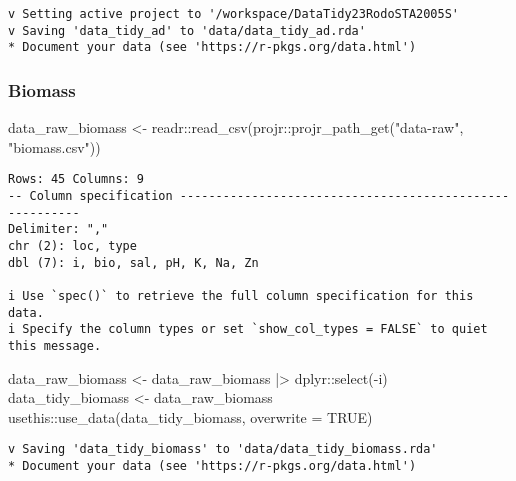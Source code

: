 \documentclass[
  letterpaper,
  DIV=11,
  numbers=noendperiod]{scrartcl}
\newenvironment{Shaded}{\begin{snugshade}}{\end{snugshade}}
\newcommand{\AttributeTok}[1]{\textcolor[rgb]{0.40,0.45,0.13}{#1}}
\newcommand{\ConstantTok}[1]{\textcolor[rgb]{0.56,0.35,0.01}{#1}}
\newcommand{\FunctionTok}[1]{\textcolor[rgb]{0.28,0.35,0.67}{#1}}
\newcommand{\NormalTok}[1]{\textcolor[rgb]{0.00,0.23,0.31}{#1}}
\newcommand{\OtherTok}[1]{\textcolor[rgb]{0.00,0.23,0.31}{#1}}
\newcommand{\SpecialCharTok}[1]{\textcolor[rgb]{0.37,0.37,0.37}{#1}}
\newcommand{\StringTok}[1]{\textcolor[rgb]{0.13,0.47,0.30}{#1}}
\begin{document}
\begin{verbatim}
v Setting active project to '/workspace/DataTidy23RodoSTA2005S'
v Saving 'data_tidy_ad' to 'data/data_tidy_ad.rda'
* Document your data (see 'https://r-pkgs.org/data.html')
\end{verbatim}

\hypertarget{biomass}{%
\subsubsection{Biomass}\label{biomass}}

\begin{Shaded}
\begin{Highlighting}[]
\NormalTok{data\_raw\_biomass }\OtherTok{\textless{}{-}}\NormalTok{ readr}\SpecialCharTok{::}\FunctionTok{read\_csv}\NormalTok{(projr}\SpecialCharTok{::}\FunctionTok{projr\_path\_get}\NormalTok{(}\StringTok{"data{-}raw"}\NormalTok{, }\StringTok{"biomass.csv"}\NormalTok{))}
\end{Highlighting}
\end{Shaded}

\begin{verbatim}
Rows: 45 Columns: 9
-- Column specification --------------------------------------------------------
Delimiter: ","
chr (2): loc, type
dbl (7): i, bio, sal, pH, K, Na, Zn

i Use `spec()` to retrieve the full column specification for this data.
i Specify the column types or set `show_col_types = FALSE` to quiet this message.
\end{verbatim}

\begin{Shaded}
\begin{Highlighting}[]
\NormalTok{data\_raw\_biomass }\OtherTok{\textless{}{-}}\NormalTok{ data\_raw\_biomass }\SpecialCharTok{|\textgreater{}}
\NormalTok{  dplyr}\SpecialCharTok{::}\FunctionTok{select}\NormalTok{(}\SpecialCharTok{{-}}\StringTok{\textasciigrave{}}\AttributeTok{i}\StringTok{\textasciigrave{}}\NormalTok{)}
\NormalTok{data\_tidy\_biomass }\OtherTok{\textless{}{-}}\NormalTok{ data\_raw\_biomass}
\NormalTok{usethis}\SpecialCharTok{::}\FunctionTok{use\_data}\NormalTok{(data\_tidy\_biomass, }\AttributeTok{overwrite =} \ConstantTok{TRUE}\NormalTok{)}
\end{Highlighting}
\end{Shaded}

\begin{verbatim}
v Saving 'data_tidy_biomass' to 'data/data_tidy_biomass.rda'
* Document your data (see 'https://r-pkgs.org/data.html')
\end{verbatim}
\end{document}
